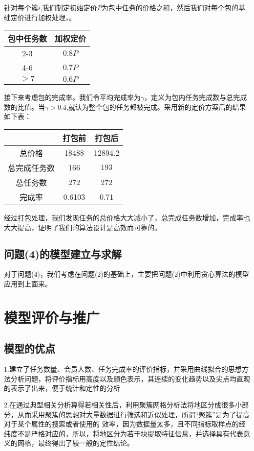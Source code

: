 \documentclass{ctexart}
\begin{document}
针对每个簇$i$,我们制定初始定价$P$为包中任务的价格之和，然后我们对每个包的基础定价进行加权处理，。
\begin{table}[htbp]
\centering
\begin{tabular}{|c|c|}
\hline
包中任务数&加权定价\\
\hline
2-3 &$0.8P$\\
\hline
4-6&$0.7P$\\
\hline
$\ge7$&$0.6P$\\
\hline
\end{tabular}
\end{table}
接下来考虑包的完成率。我们令平均完成率为$\gamma$，定义为包内任务完成数与总完成数的比值。当$\gamma    >0.4$,就认为整个包的任务都被完成。采用新的定价方案后的结果如下表：
\begin{table}[htbp]
\centering
\begin{tabular}{|c|c|c|}
\hline
\ &打包前&打包后\\
\hline
总价格&18488&12894.2\\
\hline
总完成任务数&166&$193$\\
\hline
总任务数&272&272\\
\hline
完成率&0.6103&0.71\\
\hline
\end{tabular}
\end{table}
经过打包处理，我们发现任务的总价格大大减小了，总完成任务数增加，完成率也大大提高，证明了我们的算法设计是高效而可靠的。
\subsection{问题(4)的模型建立与求解}
对于问题(4)，我们考虑在问题(2)的基础上，主要把问题(2)中利用贪心算法的模型应用到上面来。


\section{模型评价与推广}
\subsection{模型的优点}
1.建立了任务数量、会员人数、任务完成率的评价指标，并采用曲线拟合的思想方法分析问题，将评价指标用高度以及颜色表示，其连续的变化趋势以及尖点均直观的表示了出来，便于统计和定性的分析

2.在通过典型相关分析算得若相关性后，利用聚簇网格分析法将地区分成很多小部分，从而采用聚簇的思想对大量数据进行筛选和近似处理，所谓“聚簇”是为了提高对于某个属性的搜索或者使用的 效率，因为数据量太多，且不同指标取样点的经纬度不是严格对应的，所以，将地区分为若干块提取特征信息，并选择具有代表意义的网格，最终得出了较一般的定性结论。
\end{document}
